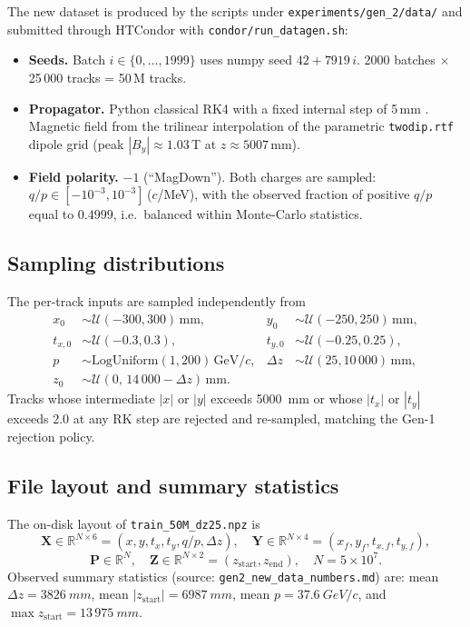 \documentclass[a4paper,11pt]{article}
\newcommand{\SI}[2]{#1~#2}
\newcommand{\qop}{q/p}
\newcommand{\dz}{\Delta z}
\begin{document}
The new dataset is produced by the scripts under
\texttt{experiments/gen\_2/data/} and submitted through HTCondor with
\texttt{condor/run\_datagen.sh}:
\begin{itemize}
\item \textbf{Seeds.} Batch $i\in\{0,\dots,1999\}$ uses numpy seed
  $42 + 7919\,i$. 2000 batches $\times$ 25\,000 tracks = 50\,M tracks.
\item \textbf{Propagator.} Python classical RK4 with a fixed internal
  step of 5\,mm \cite{gen1report}. Magnetic field from the trilinear
  interpolation of the parametric \texttt{twodip.rtf} dipole grid
  (peak $|B_y|\approx1.03$\,T at $z\approx5007$\,mm).
\item \textbf{Field polarity.} $-1$ (``MagDown''). Both charges are
  sampled: $\qop\in[-10^{-3},10^{-3}]$\,($c$/MeV), with the observed
  fraction of positive $\qop$ equal to $0.4999$, i.e.\ balanced within
  Monte-Carlo statistics.
\end{itemize}

\subsection{Sampling distributions}

The per-track inputs are sampled independently from
\begin{align}
x_0 &\sim \mathcal{U}(-300,300)\,\mathrm{mm}, &
y_0 &\sim \mathcal{U}(-250,250)\,\mathrm{mm}, \\
t_{x,0} &\sim \mathcal{U}(-0.3,0.3), &
t_{y,0} &\sim \mathcal{U}(-0.25,0.25), \\
p &\sim \mathrm{LogUniform}(1,200)\,\mathrm{GeV}/c, &
\dz &\sim \mathcal{U}(25,10\,000)\,\mathrm{mm}, \\
z_0 &\sim \mathcal{U}(0,\,14\,000-\dz)\,\mathrm{mm}.
\end{align}
Tracks whose intermediate $|x|$ or $|y|$ exceeds \SI{5000}{mm} or
whose $|t_x|$ or $|t_y|$ exceeds $2.0$ at any RK step are rejected
and re-sampled, matching the Gen-1 rejection policy.

\subsection{File layout and summary statistics}

The on-disk layout of \texttt{train\_50M\_dz25.npz} is
\[
\mathbf{X}\in\mathbb{R}^{N\times 6}=(x,y,t_x,t_y,\qop,\dz),\quad
\mathbf{Y}\in\mathbb{R}^{N\times 4}=(x_f,y_f,t_{x,f},t_{y,f}),
\]
\[
\mathbf{P}\in\mathbb{R}^{N},\quad
\mathbf{Z}\in\mathbb{R}^{N\times 2}=(z_{\mathrm{start}},z_{\mathrm{end}}),
\quad N=5\!\times\! 10^{7}.
\]
Observed summary statistics (source:
\texttt{gen2\_new\_data\_numbers.md}) are:
mean $\dz=\SI{3826}{mm}$, mean $|z_{\mathrm{start}}|=\SI{6987}{mm}$,
mean $p=\SI{37.6}{GeV}/c$, and
$\max z_{\mathrm{start}}=\SI{13\,975}{mm}$.
\end{document}
